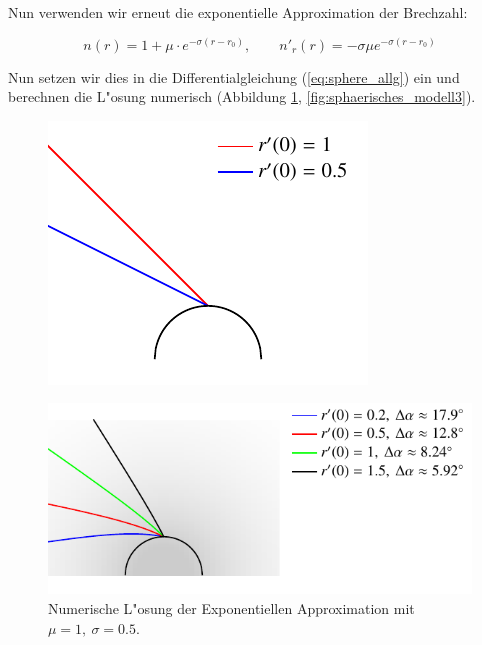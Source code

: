 \begin{refsection}
Nun verwenden wir erneut die exponentielle Approximation der Brechzahl: 

$$n(r) = 1 + \mu \cdot e^{-\sigma (r - r_0)}, \qquad n'_r(r) = -\sigma \mu e^{-\sigma (r - r_0)}$$

Nun setzen wir dies in die Differentialgleichung (\ref{eq:sphere_allg}) ein und berechnen die L"osung numerisch (Abbildung \ref{fig:sphaerisches_modell2}, \ref{fig:sphaerisches_modell3}). 

\begin{figure}
\centering
\includegraphics[scale=1]{licht/standalone/fig_sphere_simulation_vacuum.pdf}
\end{figure}

\begin{figure}
\centering
\includegraphics[scale=1]{licht/standalone/fig_sphere_simulation1.pdf}
\caption{Numerische L"osung der Exponentiellen Approximation mit $\mu = 1, \: \sigma = 0.5$. 
\label{fig:sphaerisches_modell2}}
\end{figure}


\end{refsection}
